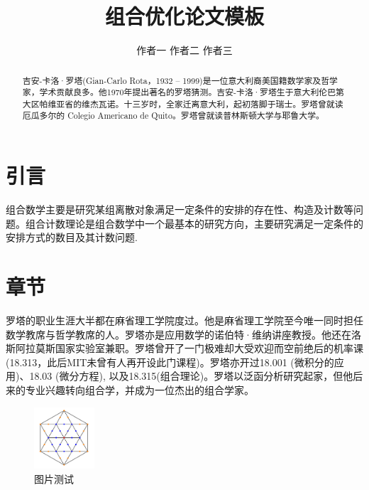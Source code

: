 \documentclass{yerbaformatPaper}
\begin{document}
\title{组合优化论文模板}

\author{作者一 \quad 作者二 \quad 作者三}
\address{上海财经大学数学学院, 上海 200433}



\maketitle

\begin{abstract}
	吉安-卡洛·罗塔(Gian-Carlo Rota，1932 – 1999)是一位意大利裔美国籍数学家及哲学家，学术贡献良多。他1970年提出著名的罗塔猜测。吉安-卡洛·罗塔生于意大利伦巴第大区帕维亚省的维杰瓦诺。十三岁时，全家迁离意大利，起初落脚于瑞士。罗塔曾就读厄瓜多尔的 Colegio Americano de Quito。罗塔曾就读普林斯顿大学与耶鲁大学。
\end{abstract}

\section{引言}

组合数学主要是研究某组离散对象满足一定条件的安排的存在性、构造及计数等问题。组合计数理论是组合数学中一个最基本的研究方向，主要研究满足一定条件的安排方式的数目及其计数问题\cite{gessel2005miki}. 

\section{章节}

罗塔的职业生涯大半都在麻省理工学院度过。他是麻省理工学院至今唯一同时担任数学教席与哲学教席的人。罗塔亦是应用数学的诺伯特·维纳讲座教授。他还在洛斯阿拉莫斯国家实验室兼职。罗塔曾开了一门极难却大受欢迎而空前绝后的机率课(18.313，此后MIT未曾有人再开设此门课程)。罗塔亦开过18.001 (微积分的应用)、18.03 (微分方程), 以及18.315(组合理论)。罗塔以泛函分析研究起家，但他后来的专业兴趣转向组合学，并成为一位杰出的组合学家。

\begin{figure}[H]
	\centering
	\includegraphics[width=0.2\textwidth]{figure/test.png}
	\caption{图片测试 \label{fig:scatter}}
\end{figure}
\end{document}

